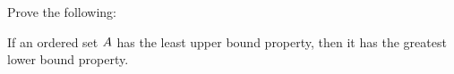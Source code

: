 \documentclass[../main.tex]{subfiles}
\begin{document}
\problem{}\label{s3p13}

Prove the following:
\begin{thm}
	If an ordered set \({A}\) has the least upper bound property,
	then it has the greatest lower bound property.
\end{thm}

\todo{}
\end{document}
